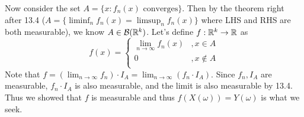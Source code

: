 \documentclass[class=article,crop=false]{standalone}
\begin{document}
\begin{prf}
\begin{enumerate}[label=(\roman*)]
\begin{case}[2]
			Now consider the set $ A = \{x: f_n(x) \text{ converges} \} $. Then by the theorem right after 13.4 ($ A = \{\liminf_{  n} f_n(x) = \limsup_{  n} f_n(x)\} $ where LHS and RHS are both measurable), we know $ A \in \mathcal{B}(\mathbb{R}^{k})$. Let's define $ f: \mathbb{R}^{k} \to \mathbb{R}$ as
			\begin{equation*}
				f(x)=
			\begin{cases}
				\lim_{ n \to \infty} f_n(x) & ,x \in A\\
				0 & , x \not\in A\\
			\end{cases}
			\end{equation*}
			Note that $ f = \left( \lim_{ n \to \infty} f_n \right) \cdot I_A = \lim_{ n \to \infty} (f_n \cdot  I_A)$. Since $ f_n, I_A$ are measurable, $ f_n \cdot I_A$ is also measurable, and the limit is also measurable by 13.4. Thus we showed that $ f$ is measurable and thus $ f(X(\omega)) = Y(\omega)$ is what we seek.
		\end{case}
\end{enumerate}
\end{prf}
\end{document}
